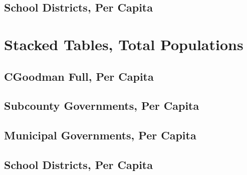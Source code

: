 \documentclass{article}
\begin{document}
\subsection{School Districts, Per Capita}


\clearpage

\clearpage



\section{Stacked Tables, Total Populations}


\subsection{CGoodman Full, Per Capita}


\clearpage

\clearpage



\subsection{Subcounty Governments, Per Capita}


\clearpage

\clearpage


\subsection{Municipal Governments, Per Capita}


\clearpage

\clearpage


\subsection{School Districts, Per Capita}


\clearpage

\end{document}
